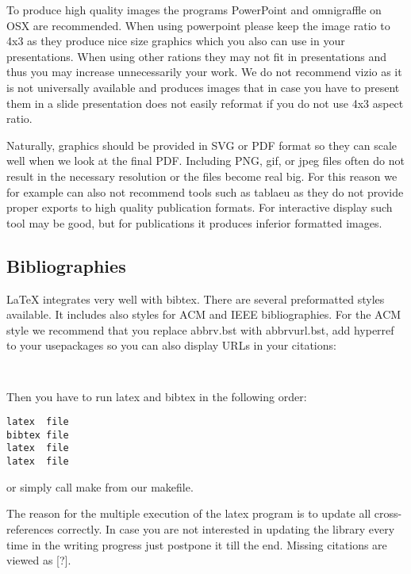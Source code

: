 To produce high quality images the programs PowerPoint and omnigraffle
on OSX are recommended. When using powerpoint please keep the image
ratio to 4x3 as they produce nice size graphics which you also can use
in your presentations. When using other rations they may not fit in
presentations and thus you may increase unnecessarily your work. We do
not recommend vizio as it is not universally available and produces
images that in case you have to present them in a slide presentation
does not easily reformat if you do not use 4x3 aspect ratio.

Naturally, graphics should be provided in SVG or PDF format so they can
scale well when we look at the final PDF. Including PNG, gif, or jpeg
files often do not result in the necessary resolution or the files
become real big. For this reason we for example can also not recommend
tools such as tablaeu as they do not provide proper exports to high
quality publication formats. For interactive display such tool may be
good, but for publications it produces inferior formatted images.

\subsection{Bibliographies}\label{bibliographies}

LaTeX integrates very well with bibtex. There are several preformatted
styles available. It includes also styles for ACM and IEEE
bibliographies. For the ACM style we recommend that you replace
abbrv.bst with abbrvurl.bst, add hyperref to your usepackages so you can
also display URLs in your citations:

\begin{verbatim}


\end{verbatim}

Then you have to run latex and bibtex in the following order:

\begin{verbatim}
latex  file
bibtex file
latex  file
latex  file
\end{verbatim}

or simply call make from our makefile.

The reason for the multiple execution of the latex program is to update
all cross-references correctly. In case you are not interested in
updating the library every time in the writing progress just postpone it
till the end. Missing citations are viewed as {[}?{]}.

